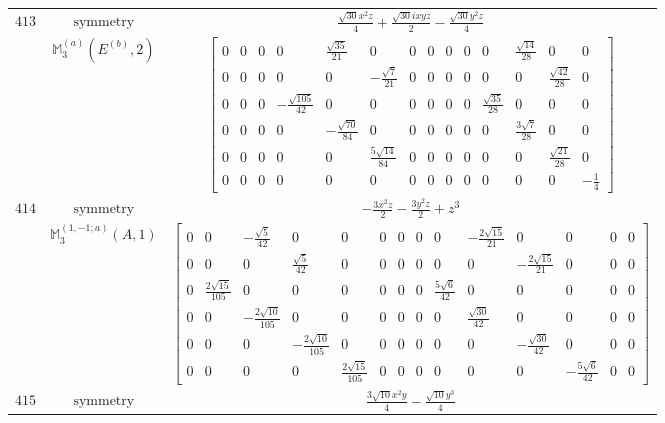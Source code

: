 \documentclass[fleqn,8pt,landscape]{jsarticle}
\begin{document}
\begin{longtable}{ccc}
$ 413 $ & $ \text{symmetry} $ & $ \frac{\sqrt{30} x^{2} z}{4} + \frac{\sqrt{30} i x y z}{2} - \frac{\sqrt{30} y^{2} z}{4} $ \\
$  $ & $ \mathbb{M}_{3}^{(a)}(E^{(b)},2) $ & $ \begin{bmatrix} 0 & 0 & 0 & 0 & \frac{\sqrt{35}}{21} & 0 & 0 & 0 & 0 & 0 & 0 & \frac{\sqrt{14}}{28} & 0 & 0 \\ 0 & 0 & 0 & 0 & 0 & - \frac{\sqrt{7}}{21} & 0 & 0 & 0 & 0 & 0 & 0 & \frac{\sqrt{42}}{28} & 0 \\ 0 & 0 & 0 & - \frac{\sqrt{105}}{42} & 0 & 0 & 0 & 0 & 0 & 0 & \frac{\sqrt{35}}{28} & 0 & 0 & 0 \\ 0 & 0 & 0 & 0 & - \frac{\sqrt{70}}{84} & 0 & 0 & 0 & 0 & 0 & 0 & \frac{3 \sqrt{7}}{28} & 0 & 0 \\ 0 & 0 & 0 & 0 & 0 & \frac{5 \sqrt{14}}{84} & 0 & 0 & 0 & 0 & 0 & 0 & \frac{\sqrt{21}}{28} & 0 \\ 0 & 0 & 0 & 0 & 0 & 0 & 0 & 0 & 0 & 0 & 0 & 0 & 0 & - \frac{1}{4} \end{bmatrix} $ \\ \hline
$ 414 $ & $ \text{symmetry} $ & $ - \frac{3 x^{2} z}{2} - \frac{3 y^{2} z}{2} + z^{3} $ \\
$  $ & $ \mathbb{M}_{3}^{(1,-1;a)}(A,1) $ & $ \begin{bmatrix} 0 & 0 & - \frac{\sqrt{5}}{42} & 0 & 0 & 0 & 0 & 0 & 0 & - \frac{2 \sqrt{15}}{21} & 0 & 0 & 0 & 0 \\ 0 & 0 & 0 & \frac{\sqrt{5}}{42} & 0 & 0 & 0 & 0 & 0 & 0 & - \frac{2 \sqrt{15}}{21} & 0 & 0 & 0 \\ 0 & \frac{2 \sqrt{15}}{105} & 0 & 0 & 0 & 0 & 0 & 0 & \frac{5 \sqrt{6}}{42} & 0 & 0 & 0 & 0 & 0 \\ 0 & 0 & - \frac{2 \sqrt{10}}{105} & 0 & 0 & 0 & 0 & 0 & 0 & \frac{\sqrt{30}}{42} & 0 & 0 & 0 & 0 \\ 0 & 0 & 0 & - \frac{2 \sqrt{10}}{105} & 0 & 0 & 0 & 0 & 0 & 0 & - \frac{\sqrt{30}}{42} & 0 & 0 & 0 \\ 0 & 0 & 0 & 0 & \frac{2 \sqrt{15}}{105} & 0 & 0 & 0 & 0 & 0 & 0 & - \frac{5 \sqrt{6}}{42} & 0 & 0 \end{bmatrix} $ \\ \hline
$ 415 $ & $ \text{symmetry} $ & $ \frac{3 \sqrt{10} x^{2} y}{4} - \frac{\sqrt{10} y^{3}}{4} $ \\

\end{longtable}
\end{document}
